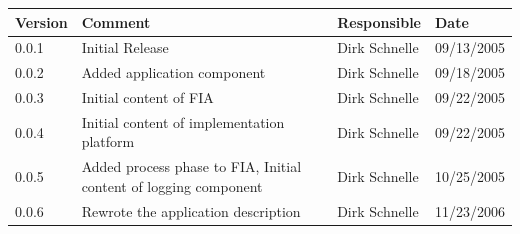 \documentclass[11pt,a4paper]{article}
\begin{document}
\begin{tabular}{|l|p{5cm}|l|l|}
\hline
\textbf{Version} & \textbf{Comment} & \textbf{Responsible} & \textbf{Date} \\
\hline
\hline
0.0.1 & Initial Release & Dirk Schnelle & 09/13/2005 \\
\hline
0.0.2 & Added application component & Dirk Schnelle & 09/18/2005 \\
\hline
0.0.3 & Initial content of FIA & Dirk Schnelle & 09/22/2005 \\
\hline
0.0.4 & Initial content of implementation platform & Dirk Schnelle & 09/22/2005 \\
\hline
0.0.5 & Added process phase to FIA, Initial content of logging component & 
Dirk Schnelle & 10/25/2005 \\
\hline
0.0.6 & Rewrote the application description & 
Dirk Schnelle & 11/23/2006 \\
\hline
\end{tabular}



\end{document}
